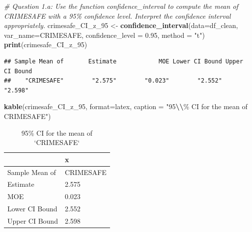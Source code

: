 \documentclass[
  11pt,
]{article}
\newenvironment{Shaded}{\begin{snugshade}}{\end{snugshade}}
\newcommand{\AttributeTok}[1]{\textcolor[rgb]{0.13,0.29,0.53}{#1}}
\newcommand{\CommentTok}[1]{\textcolor[rgb]{0.56,0.35,0.01}{\textit{#1}}}
\newcommand{\FloatTok}[1]{\textcolor[rgb]{0.00,0.00,0.81}{#1}}
\newcommand{\FunctionTok}[1]{\textcolor[rgb]{0.13,0.29,0.53}{\textbf{#1}}}
\newcommand{\NormalTok}[1]{#1}
\newcommand{\OtherTok}[1]{\textcolor[rgb]{0.56,0.35,0.01}{#1}}
\newcommand{\SpecialCharTok}[1]{\textcolor[rgb]{0.81,0.36,0.00}{\textbf{#1}}}
\newcommand{\StringTok}[1]{\textcolor[rgb]{0.31,0.60,0.02}{#1}}
\begin{document}
\begin{Shaded}
\begin{Highlighting}[]
\CommentTok{\# Question 1.a: Use the function \textasciigrave{}confidence\_interval\textasciigrave{} to compute the mean of \textasciigrave{}CRIMESAFE\textasciigrave{} with a 95\% confidence level. Interpret the confidence interval appropriately.}
\NormalTok{crimesafe\_CI\_z\_95 }\OtherTok{\textless{}{-}} \FunctionTok{confidence\_interval}\NormalTok{(}\AttributeTok{data=}\NormalTok{df\_clean, }
                                         \AttributeTok{var\_name=}\StringTok{\textquotesingle{}CRIMESAFE\textquotesingle{}}\NormalTok{, }
                                         \AttributeTok{confidence\_level =} \FloatTok{0.95}\NormalTok{, }\AttributeTok{method =} \StringTok{"t"}\NormalTok{)}
\FunctionTok{print}\NormalTok{(crimesafe\_CI\_z\_95)}
\end{Highlighting}
\end{Shaded}

\begin{verbatim}
## Sample Mean of       Estimate            MOE Lower CI Bound Upper CI Bound
##    "CRIMESAFE"        "2.575"        "0.023"        "2.552"        "2.598"
\end{verbatim}

\begin{Shaded}
\begin{Highlighting}[]
\FunctionTok{kable}\NormalTok{(crimesafe\_CI\_z\_95, }\AttributeTok{format=}\StringTok{\textquotesingle{}latex\textquotesingle{}}\NormalTok{, }\AttributeTok{caption =} \StringTok{"95}\SpecialCharTok{\textbackslash{}\textbackslash{}}\StringTok{\% CI for the mean of \textasciigrave{}CRIMESAFE\textasciigrave{}"}\NormalTok{)}
\end{Highlighting}
\end{Shaded}

\begin{table}

\caption{\label{tab:q1-a}95\% CI for the mean of `CRIMESAFE`}
\centering
\begin{tabular}[t]{l|l}
\hline
  & x\\
\hline
Sample Mean of & CRIMESAFE\\
\hline
Estimate & 2.575\\
\hline
MOE & 0.023\\
\hline
Lower CI Bound & 2.552\\
\hline
Upper CI Bound & 2.598\\
\hline
\end{tabular}
\end{table}
\end{document}
